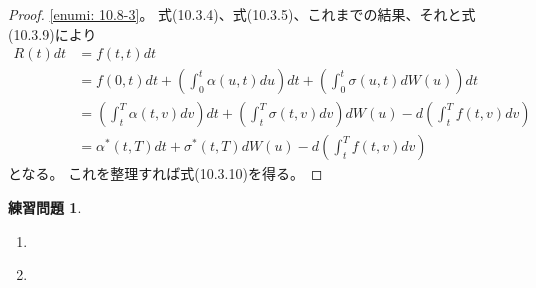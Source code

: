 \documentclass[uplatex]{jsarticle}
\theoremstyle{definition}
\newtheorem{prob}[prob]{練習問題}
\begin{document}
\begin{proof}
  \ref{enumi: 10.8-3}。
  式(10.3.4)、式(10.3.5)、これまでの結果、それと式(10.3.9)により
  \begin{align*}
    R(t)dt &= f(t,t)dt \\
    &= f(0,t)dt + \left( \int_0^t\alpha(u,t)du \right) dt
    + \left( \int_0^t\sigma(u,t)dW(u) \right) dt \\
    &= \left( \int_t^T\alpha(t,v)dv\right) dt
    + \left( \int_t^T\sigma(t,v)dv \right) dW(u)
    - d\left( \int_t^Tf(t,v)dv \right) \\
    &= \alpha^*(t,T) dt
    + \sigma^*(t,T) dW(u)
    - d\left( \int_t^Tf(t,v)dv \right)
  \end{align*}
  となる。
  これを整理すれば式(10.3.10)を得る。
\end{proof}











\begin{prob}\label{prob: 10.9}
  \begin{enumerate}
    \item \label{enumi: 10.9-1}
    \item \label{enumi: 10.9-2}
  \end{enumerate}
\end{prob}
\end{document}
